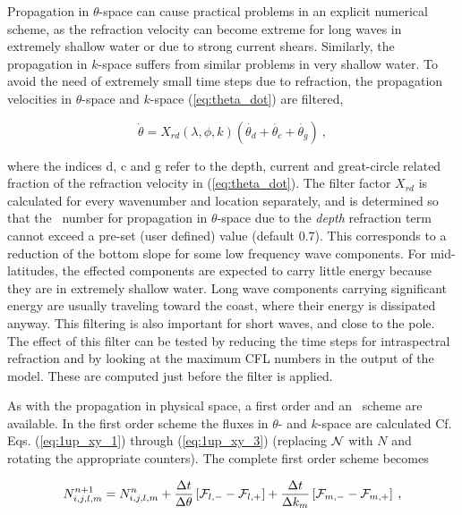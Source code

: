 Propagation in $\theta$-space can cause practical problems in an explicit
numerical scheme, as the refraction velocity can become extreme for long waves
in extremely shallow water or due to strong current shears. Similarly, 
the propagation in $k$-space suffers from similar problems in very shallow water. 
To avoid the need of extremely small time steps
due to refraction, the propagation velocities in $\theta$-space and $k$-space
(\ref{eq:theta_dot}) are filtered,


\begin{equation}
\dot{\theta} = X_{rd}(\lambda,\phi,k)\left( \dot{\theta_d} + 
\dot{\theta_c} + \dot{\theta_g} \right)\: , \label{eq:theta_filter} \end{equation}

\noindent
where the indices d, c and g refer to the depth, current and great-circle related fraction of
the refraction velocity in (\ref{eq:theta_dot}). The filter factor $X_{rd}$ is
calculated for every wavenumber and location separately, and is determined so
that the \cfl\ number for propagation in $\theta$-space due to the {\em depth}
refraction term cannot exceed a pre-set (user defined) value (default
0.7). This corresponds to a reduction of the bottom slope for some low
frequency wave components. For mid-latitudes, the effected components are expected to carry
little energy because they are in extremely shallow water. Long wave
components carrying significant energy are usually traveling toward the coast,
where their energy is dissipated anyway. This filtering is also important for short waves, 
and close to the pole. The effect of this filter can be tested by reducing the time steps for
intraspectral refraction and by looking at the maximum CFL numbers in the output of the model. 
These are computed just before the filter is applied. 

\vspace{\baselineskip} \noindent 
As with the propagation in physical space, a first order and an \uq\ scheme
are available. In the first order scheme the fluxes in $\theta$- and $k$-space
are calculated Cf. Eqs. (\ref{eq:1up_xy_1}) through (\ref{eq:1up_xy_3})
(replacing ${\cal N}$ with $N$ and rotating the appropriate counters). The complete
first order scheme becomes


\begin{equation}
N_{i,j,l,m}^{n+1} = N_{i,j,l,m}^n 
 + \frac{\Delta t}{\Delta \theta} \left [ {\cal F}_{l,-} - {\cal F}_{l,+} \right ]
 + \frac{\Delta t}{\Delta k_m} \left [ {\cal F}_{m,-} - {\cal F}_{m,+} \right ]
\: , \label{eq:1up_intra_tot} \end{equation}

